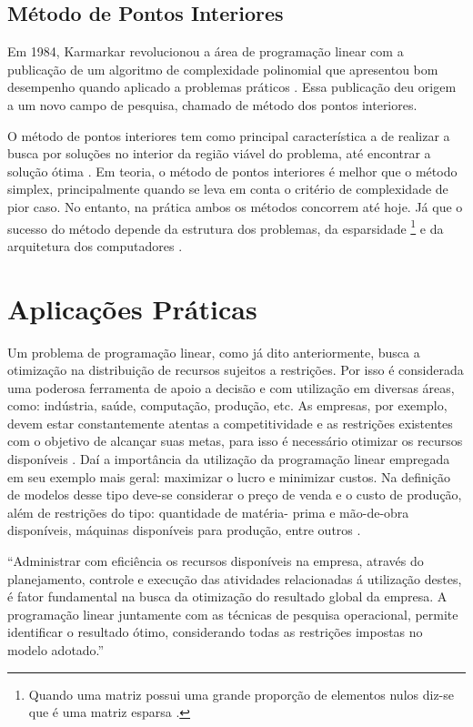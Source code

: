 \subsection{Método de Pontos Interiores}
Em 1984, Karmarkar revolucionou a área de programação linear com a publicação de um algoritmo de complexidade polinomial que apresentou bom desempenho quando aplicado a problemas práticos \cite{MaculanPI}. Essa publicação deu origem a um novo campo de pesquisa, chamado de método dos pontos interiores.

O método de pontos interiores tem como principal característica a de realizar a busca por soluções no interior da região viável do problema, até encontrar a solução ótima \cite{Pinto}.
Em teoria, o método de pontos interiores é melhor que o método simplex, principalmente quando se leva em conta o critério de complexidade de pior caso. No entanto, na prática ambos os métodos concorrem até hoje. Já que o sucesso do método depende da estrutura dos problemas, da esparsidade \footnote{Quando uma matriz possui uma grande proporção de elementos nulos diz-se que é uma matriz esparsa \cite{Munari}.} e da arquitetura dos computadores \cite{MaculanPI}.

\section{Aplicações Práticas}
Um problema de programação linear, como já dito anteriormente, busca a otimização na distribuição de recursos sujeitos a restrições. Por isso é considerada uma poderosa ferramenta de apoio a decisão \cite{FrossardMaxMin} e com utilização em diversas áreas, como: indústria, saúde, computação, produção, etc.
As empresas, por exemplo, devem estar constantemente atentas a competitividade e as restrições existentes com o objetivo de alcançar suas metas, para isso é necessário otimizar os recursos disponíveis \cite{FrossardMaxMin}. Daí a importância da utilização da programação linear empregada em seu exemplo mais geral: maximizar o lucro e minimizar custos.  Na definição de modelos desse tipo deve-se considerar o preço de venda e o custo de produção, além de restrições do tipo: quantidade de matéria- prima e mão-de-obra disponíveis, máquinas disponíveis para produção, entre outros \cite{FrossardMaxMin}.

\begin{citacao}
“Administrar com eficiência os recursos disponíveis na empresa, através do planejamento, controle e execução das atividades relacionadas á utilização destes, é fator fundamental na busca da otimização do resultado global da empresa. A programação linear juntamente com as técnicas de pesquisa operacional, permite identificar o resultado ótimo, considerando todas as restrições impostas no modelo adotado.” \cite[p.~31]{FrossardMaxMin}
\end{citacao}


